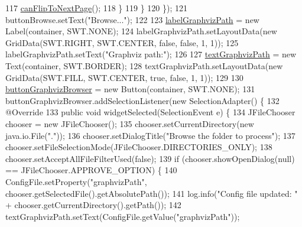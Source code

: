 \begin{DoxyCode}
117                     \hyperlink{classit_1_1isislab_1_1masonhelperdocumentation_1_1mason_1_1wizards_1_1_b___project_information_page_af534554cbdceb3c61b1f48b5df4e290c}{canFlipToNextPage}();
118                 \}
119             \}
120         \});
121         buttonBrowse.setText(\textcolor{stringliteral}{"Browse..."});
122         
123         \hyperlink{classit_1_1isislab_1_1masonhelperdocumentation_1_1mason_1_1wizards_1_1_b___project_information_page_a57169e3a422df52ec0ade1e68cab1e02}{labelGraphvizPath} = \textcolor{keyword}{new} Label(container, SWT.NONE);
124         labelGraphvizPath.setLayoutData(\textcolor{keyword}{new} GridData(SWT.RIGHT, SWT.CENTER, \textcolor{keyword}{false}, \textcolor{keyword}{false}, 1, 1));
125         labelGraphvizPath.setText(\textcolor{stringliteral}{"Graphviz path:"});
126         
127         \hyperlink{classit_1_1isislab_1_1masonhelperdocumentation_1_1mason_1_1wizards_1_1_b___project_information_page_a7aefdf9fbb7f43f9b7d2a8175e7128e7}{textGraphvizPath} = \textcolor{keyword}{new} Text(container, SWT.BORDER);
128         textGraphvizPath.setLayoutData(\textcolor{keyword}{new} GridData(SWT.FILL, SWT.CENTER, \textcolor{keyword}{true}, \textcolor{keyword}{false}, 1, 1));
129         
130         \hyperlink{classit_1_1isislab_1_1masonhelperdocumentation_1_1mason_1_1wizards_1_1_b___project_information_page_ac42d6f27c381517f450b92aff3407d3b}{buttonGraphvizBrowser} = \textcolor{keyword}{new} Button(container, SWT.NONE);
131         buttonGraphvizBrowser.addSelectionListener(\textcolor{keyword}{new} SelectionAdapter() \{
132             @Override
133             \textcolor{keyword}{public} \textcolor{keywordtype}{void} widgetSelected(SelectionEvent e) \{
134                 JFileChooser chooser = \textcolor{keyword}{new} JFileChooser();
135                 chooser.setCurrentDirectory(\textcolor{keyword}{new} java.io.File(\textcolor{stringliteral}{"."}));
136                 chooser.setDialogTitle(\textcolor{stringliteral}{"Browse the folder to process"});
137                 chooser.setFileSelectionMode(JFileChooser.DIRECTORIES\_ONLY);
138                 chooser.setAcceptAllFileFilterUsed(\textcolor{keyword}{false});
139                 \textcolor{keywordflow}{if} (chooser.showOpenDialog(null) == JFileChooser.APPROVE\_OPTION) \{                  
140                     ConfigFile.setProperty(\textcolor{stringliteral}{"graphvizPath"}, chooser.getSelectedFile().getAbsolutePath());
141                     log.info(\textcolor{stringliteral}{"Config file updated: "} + chooser.getCurrentDirectory().getPath());
142                     textGraphvizPath.setText(ConfigFile.getValue(\textcolor{stringliteral}{"graphvizPath"}));

\end{DoxyCode}
